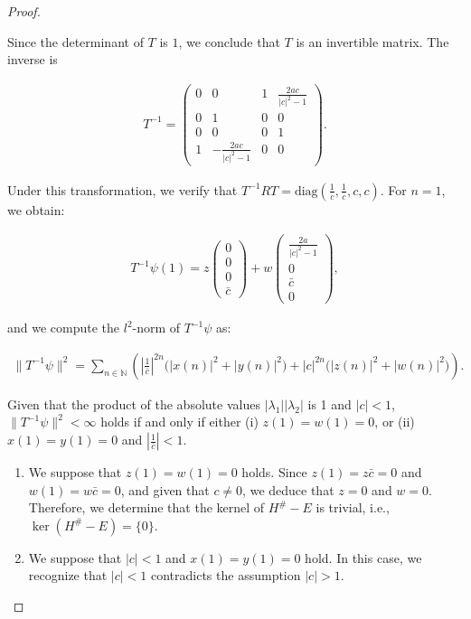 \documentclass[10pt,a4paper]{amsart}
\begin{document}
\begin{proof}
\begin{enumerate}
    Since the determinant of \(T\) is $1$, we conclude that \(T\) is an invertible matrix. The inverse is

    \begin{align*}
    T^{-1} = \begin{pmatrix}
    0 & 0 & 1 & \frac{2a c}{|c|^2 - 1} \\
    0 & 1 & 0 & 0 \\
    0 & 0 & 0 & 1 \\
    1 & -\frac{2a c}{|c|^2 - 1} & 0 & 0
    \end{pmatrix}.
    \end{align*}

    Under this transformation, we verify that \(T^{-1} R T = \text{diag}\left( \frac{1}{\bar{c}}, \frac{1}{\bar{c}}, c, c \right)\). For \(n = 1\), we obtain:

    \begin{align*}
    T^{-1} \psi(1) = z \begin{pmatrix} 0 \\ 0 \\ 0 \\ \bar{c} \end{pmatrix} + w \begin{pmatrix} \frac{2a}{|c|^2 - 1} \\ 0 \\ \bar{c} \\ 0 \end{pmatrix},
    \end{align*}

    and we compute the \(l^2\)-norm of \(T^{-1} \psi\) as:

    \begin{align*}
    \| T^{-1} \psi \|^2 = \sum_{n \in \mathbb{N}} \left( \left| \frac{1}{\bar{c}} \right|^{2n} \big( |x(n)|^2 + |y(n)|^2 \big) + |c|^{2n} \big( |z(n)|^2 + |w(n)|^2 \big) \right).
    \end{align*}

   Given that the product of the absolute values \(|\lambda_1| |\lambda_2|\) is 1 and \(|c| < 1\), \(\| T^{-1} \psi \|^2 < \infty\) holds if and only if either (i) \(z(1) = w(1) = 0\), or (ii) \(x(1) = y(1) = 0\) and \(\left| \frac{1}{\bar{c}} \right| < 1\).

    \begin{enumerate}
        \item We suppose that \(z(1) = w(1) = 0\) holds. Since \(z(1) = z \bar{c} = 0\) and \(w(1) = w \bar{c} = 0\), and given that \(c \neq 0\), we deduce that \(z = 0\) and \(w = 0\). Therefore, we determine that the kernel of \(H^\# - E\) is trivial, i.e., \(\ker(H^\# - E) = \{0\}\).

        \item We suppose that \(|c| < 1\) and \(x(1) = y(1) = 0\) hold. In this case, we recognize that \(|c| < 1\) contradicts the assumption \(|c| > 1\).
    \end{enumerate}
\end{enumerate}
  \end{proof}
\end{document}
